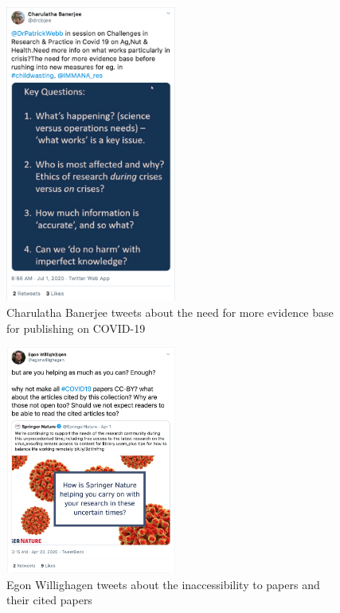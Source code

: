 \documentclass[acmsmall,authordraft]{acmart}
\begin{document}
\begin{figure}
  \includegraphics[width=0.5\textwidth]{Pictures/Appendix_Tweets/charulatha banerjee tweet.png}
  \caption{Charulatha Banerjee tweets about the need for more evidence base for publishing on COVID-19}
  \label{charulatha_banerjee_tweet}
\end{figure}

\begin{figure}
  \includegraphics[width=0.5\textwidth]{Pictures/Appendix_Tweets/egon willighagen tweet.png}
  \caption{Egon Willighagen tweets about the inaccessibility to papers and their cited papers}
  \label{egon_willighagen_tweet}
\end{figure}
\end{document}
